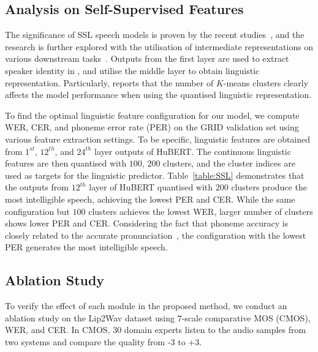 \documentclass[letterpaper]{article} %
\begin{document}
\subsection{Analysis on Self-Supervised Features}
The significance of SSL speech models is proven by the recent studies~\cite{baevski2020wav2vec,hsu2021hubert}, and the research is further explored with the utilisation of intermediate representations on various downstream tasks~\cite{yang21c_interspeech,chang2022distilhubert}.
Outputs from the first layer are used to extract speaker identity in \cite{fan2020exploring,choi2021neural}, and \cite{lakhotia2021generative,lee2022hierspeech} utilise the middle layer to obtain linguistic representation.
Particularly, \cite{lakhotia2021generative} reports that the number of $K$-means clusters clearly affects the model performance when using the quantised linguistic representation.

To find the optimal linguistic feature configuration for our model, we compute WER, CER, and phoneme error rate (PER) on the GRID validation set using various feature extraction settings.
To be specific, linguistic features are obtained from $1^{st}$, $12^{th}$, and $24^{th}$ layer outputs of HuBERT. The continuous linguistic features are then quantised with $100$, $200$ clusters, and the cluster indices are used as targets for the linguistic predictor.
Table~\ref{table:SSL} demonstrates that the outputs from $12^{th}$ layer of HuBERT quantised with $200$ clusters produce the most intelligible speech, achieving the lowest PER and CER.
While the same configuration but $100$ clusters achieves the lowest WER, larger number of clusters shows lower PER and CER. Considering the fact that phoneme accuracy is closely related to the accurate pronunciation~\cite{zhang2022mixed}, the configuration with the lowest PER generates the most intelligible speech.

\subsection{Ablation Study}
\label{sec:ablation}

To verify the effect of each module in the proposed method, we conduct an ablation study on the Lip2Wav dataset using $7$-scale comparative MOS (CMOS), WER, and CER.
In CMOS, 30 domain experts listen to the audio samples from two systems and compare the quality from -$3$ to +$3$.
\end{document}
